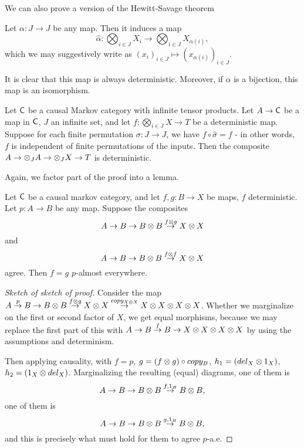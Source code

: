 \documentclass[11pt]{article}
\begin{document}
We can also prove a version of the Hewitt-Savage theorem
\begin{definition}
    Let $\alpha: J \to J$ be any map.
    Then it induces a map 
    \[\hat{\alpha}: \bigotimes_{i\in J}X_i \to \bigotimes_{i \in J}X_{\alpha(i)},\]
    which we may suggestively write as $(x_i)_{i\in J} \mapsto (x_{\alpha(i)})_{i\in J}$.
    
    It is clear that this map is always deterministic. Moreover, if $\alpha$ is a bijection, this map is an isomorphism.
\end{definition}

\begin{theorem}
    \label{thm:hewsav}
    Let $\mathsf{C}$ be a causal Markov category with infinite tensor products. Let $A \to \mathsf{C}$ be a map in $\mathsf{C}$, $J$ an infinite set, and let $f: \bigotimes_{i \in J}X \to T$ be a deterministic map.
    Suppose for each finite permutation $\sigma: J \to J$, we have $f \circ \hat{\sigma} = f$ - in other words, $f$ is independent of finite permutations of the inputs.
    Then the composite $A \to \otimes_J A \to \otimes_J X \to T$ is deterministic.
\end{theorem}
Again, we factor part of the proof into a lemma.
\begin{lemma}
    Let $\mathsf{C}$ be a causal markov category, and let $f,g: B \to X$ be maps, $f$ deterministic.
    Let $p: A \to B$ be any map.
    Suppose the composites 
    \[A \to B \to B \otimes B \overset{f \otimes g}{\to} X \otimes X\]
    and
    \[A \to B \to B \otimes B \overset{f \otimes f}{\to} X \otimes X\]
    agree. Then $f = g$ $p$-almost everywhere.
\end{lemma}
\begin{proof}[Sketch of sketch of proof]
    Consider the map
    $A \overset{p}{\to} B \to B \otimes B \overset{f \otimes g}{\to} X \otimes X \overset{copy_{X \otimes X}}{\to} X \otimes X \otimes X \otimes X$.
    Whether we marginalize on the first or second factor of $X$, we get equal morphisms, because we may replace the first part of this with
    $A \to B \overset{f}{\to} B \to X \otimes X \otimes X \otimes X$ by using the assumptions and determinism.

    Then applying causality, with $f = p$, $g= (f \otimes g) \circ copy_B$, $h_1 = (del_X \otimes 1_X)$, $h_2  = (1_X \otimes del_X)$.
    Marginalizing the resulting (equal) diagrams, one of them is 
    \[A \to B \to B \otimes B \overset{f, 1_B}{\to} B \otimes B,\]
    one of them is 
    \[A \to B \to B \otimes B \overset{g,1_B}{\to} B \otimes B,\]
    and this is precisely what must hold for them to agree $p$-a.e.
\end{proof}
\end{document}

